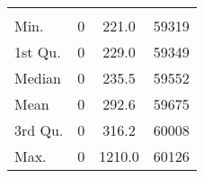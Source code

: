 \begin{tabular}{lS[table-format=5.1]S[table-format=5.1]S[table-format=5.1]}
&  &  &  \\
 Min.    & 0 & 221.0 & 59319 \\
 1st Qu. & 0 & 229.0 & 59349 \\
 Median  & 0 & 235.5 & 59552 \\
 Mean    & 0 & 292.6 & 59675 \\
 3rd Qu. & 0 & 316.2 & 60008 \\
 Max.    & 0 & 1210.0 & 60126 \\
\end{tabular}
